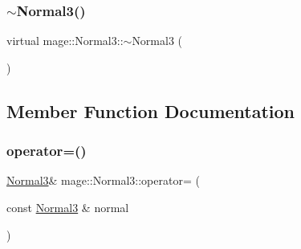 \hypertarget{structmage_1_1_normal3_ae5ea8901723ca2dfe8d692e7269935f9}{}\label{structmage_1_1_normal3_ae5ea8901723ca2dfe8d692e7269935f9} 
\subsubsection{\texorpdfstring{$\sim$\+Normal3()}{~Normal3()}}
{\footnotesize\ttfamily virtual mage\+::\+Normal3\+::$\sim$\+Normal3 (\begin{DoxyParamCaption}{ }\end{DoxyParamCaption})\hspace{0.3cm}{\ttfamily [virtual]}}



\subsection{Member Function Documentation}
\hypertarget{structmage_1_1_normal3_ade86357989ceaecf1b22bb9e53ca7fed}{}\label{structmage_1_1_normal3_ade86357989ceaecf1b22bb9e53ca7fed} 
\subsubsection{\texorpdfstring{operator=()}{operator=()}}
{\footnotesize\ttfamily \hyperlink{structmage_1_1_normal3}{Normal3}\& mage\+::\+Normal3\+::operator= (\begin{DoxyParamCaption}\item[{const \hyperlink{structmage_1_1_normal3}{Normal3} \&}]{normal }\end{DoxyParamCaption})}

